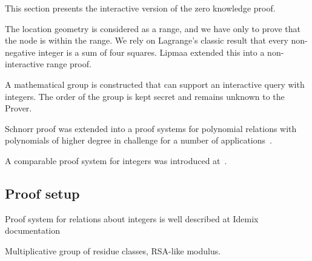 \documentclass{article}
\begin{document}
{This section presents the interactive version of the zero knowledge proof. 

The location geometry is considered as a range, and we have only to prove that the node is within the range. 
We rely on Lagrange's classic result that every non-negative integer is a sum of four squares. 
Lipmaa extended this into a non-interactive range proof. 

A mathematical group is constructed that can support an interactive query with integers. 
The order of the group is kept secret and remains unknown to the Prover.

Schnorr proof was extended into a proof systems for polynomial relations
with polynomials of higher degree in challenge
for a number of applications~\cite{F363,CF12}.

A comparable proof system for integers was introduced at~\cite{F10}.

\subsection{Proof setup}

Proof system for relations about integers is well described at Idemix documentation~\cite{Indemix}

Multiplicative group of residue classes, RSA-like modulus.

\begin{figure}[!htb]
\begin{tabular}{|p{\linewidth}|}
\hline


\end{tabular}
\end{figure}}
\end{document}
